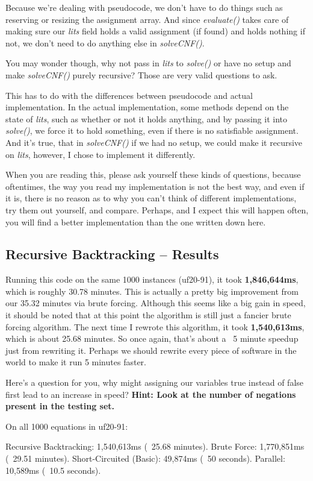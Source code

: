 Because we're dealing with pseudocode, we don't have to do things such as
reserving or resizing the assignment array. And since \textit{evaluate()} takes
care of making sure our \textit{lits} field holds a valid assignment (if found)
and holds nothing if not, we don't need to do anything else in
\textit{solveCNF()}.

You may wonder though, why not pass in \textit{lits} to \textit{solve()} or
have no setup and make \textit{solveCNF()} purely recursive?
Those are very valid questions to ask.

This has to do with the differences between pseudocode and actual
implementation. In the actual implementation, some methods depend on the
state of \textit{lits}, such as whether or not it holds anything, and by passing
it into \textit{solve()}, we force it to hold something, even if there is no
satisfiable assignment. And it's true, that in \textit{solveCNF()} if we had no
setup, we could make it recursive on \textit{lits}, however, I chose to
implement it differently.

When you are reading this, please ask yourself these kinds of questions,
because oftentimes, the way you read my implementation is not the best way,
and even if it is, there is no reason as to why you can't think of different
implementations, try them out yourself, and compare. Perhaps, and I expect
this will happen often, you will find a better implementation than the one
written down here.

\subsection{Recursive Backtracking -- Results}

Running this code on the same 1000 instances (uf20-91), it took
\textbf{1,846,644ms}, which is roughly 30.78 minutes. This is actually a pretty big
improvement from our 35.32 minutes via brute forcing. Although this seems
like a big gain in speed, it should be noted that at this point the algorithm is
still just a fancier brute forcing algorithm. The next time I rewrote this algorithm,
it took \textbf{1,540,613ms}, which is about 25.68 minutes. So once again, that's about a 
~5 minute speedup just from rewriting it. Perhaps we should rewrite every piece of 
software in the world to make it run 5 minutes faster. 

Here's a question for you, why might assigning our variables true instead of
false first lead to an increase in speed? \textbf{Hint: Look at the number of negations 
present in the testing set.}

\begin{FVerbatim}
On all 1000 equations in uf20-91:

Recursive Backtracking:    1,540,613ms (~25.68 minutes).
Brute Force:               1,770,851ms (~29.51 minutes).
Short-Circuited (Basic):   49,874ms (~50 seconds).
Parallel:                  10,589ms (~10.5 seconds).
\end{FVerbatim}
